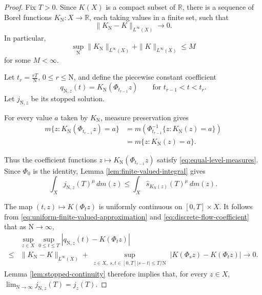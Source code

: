 \documentclass[10pt,a4paper]{amsart}
\begin{document}
\begin{proof}
Fix $T>0$. Since $K(X)$ is a compact subset of $\mathbb R$, there is a sequence of Borel functions $K_{\mathrm{N}}\colon X\to\mathbb R$, each taking values in a finite set, such that
\begin{equation}\label{eq:uniform-finite-valued-approximation}
\|K_{\mathrm{N}}-K\|_{L^\infty(X)}\longrightarrow0.
\end{equation}
In particular,
\begin{equation}\label{eq:uniform-coefficient-bound}
\sup_{\mathrm{N}}\|K_{\mathrm{N}}\|_{L^\infty(X)}+\|K\|_{L^\infty(X)}\le M
\end{equation}
for some $M<\infty$.

Let $t_r=\frac{rT}{{\mathrm{N}}}$, \;$0\le r\le {\mathrm{N}}$,
and define the piecewise constant coefficient
\begin{equation}\label{eq:discrete-flow-coefficient}
q_{{\mathrm{N}}, z}(t)=K_{\mathrm{N}}(\Phi_{t_{r-1}}z)
\qquad
\text{for }t_{r-1}<t<t_r.
\end{equation}
Let $j_{{\mathrm{N}}, z}$ be its stopped solution.

For every value $a$ taken by $K_{\mathrm{N}}$, measure preservation gives
\begin{align*}
m\{z:K_{\mathrm{N}}(\Phi_{t_{r-1}}z)=a\}
& =
m\left(\Phi_{t_{r-1}}^{-1}\{z:K_{\mathrm{N}}(z)=a\}\right)\\
& =
m\{z:K_{\mathrm{N}}(z)=a\}.
\end{align*}

Thus the coefficient functions $z\longmapsto K_{\mathrm{N}}(\Phi_{t_{r-1}}z)$ satisfy \eqref{eq:equal-level-measures}. Since $\Phi_0$ is the identity, Lemma \ref{lem:finite-valued-integral} gives
\begin{equation}\label{eq:approximating-integral-comparison}
\int_Xj_{{\mathrm{N}}, z}(T)^\mu\, dm(z)
\le \int_X\widehat s_{K_{\mathrm{N}}(z)}(T)^\mu\, dm(z).
\end{equation}

The map $(t, z)\longmapsto K(\Phi_tz)$ is uniformly continuous on $[0, T]\times X$. It follows
from \eqref{eq:uniform-finite-valued-approximation} and
\eqref{eq:discrete-flow-coefficient} that as $\mathrm{N}\to\infty$,
\begin{align*}
& \sup_{z\in X}\sup_{0\le t\le T} \left|q_{{\mathrm{N}}, z}(t)-K(\Phi_tz)\right|\\
\le& \lVert K_{\mathrm{N}}-K\rVert_{L^\infty(X)} + \sup_{\substack{z\in X, \;s, t\in[0, T] |s-t|\le T/{\mathrm{N}}}} \left|K(\Phi_sz)-K(\Phi_tz)\right| \longrightarrow0.
\end{align*}
Lemma \ref{lem:stopped-continuity} therefore implies that, for every $z\in X$, $\displaystyle \lim_{\mathrm{N}\to \infty}j_{{\mathrm{N}}, z}(T)= j_z(T)$.


\end{proof}
\end{document}
